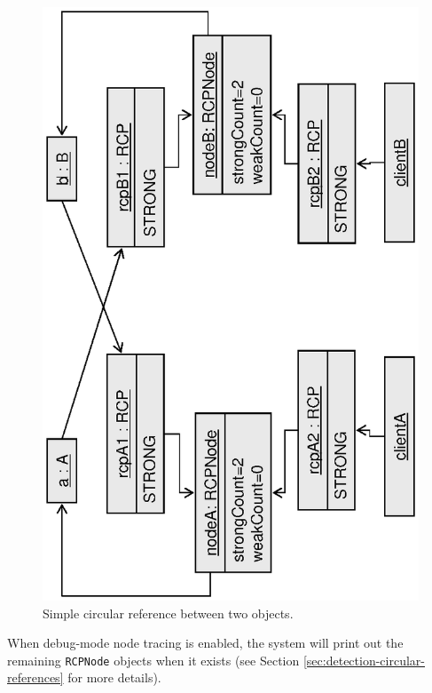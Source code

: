 \documentclass[pdf,ps2pdf,11pt]{SANDreport}
\begin{document}
{\bsinglespace
\begin{figure}
\begin{center}
\includegraphics*[angle=270,scale=0.65]{CircularRCP_A_B}
\end{center}
\caption{
\label{fig:CircularRCP_A_B}
Simple circular reference between two objects.  }
\end{figure}
\esinglespace}

When debug-mode node tracing is enabled, the system will print out the
remaining {}\texttt{RCPNode} objects when it exists (see Section
{}\ref{sec:detection-circular-references} for more details).
\end{document}
